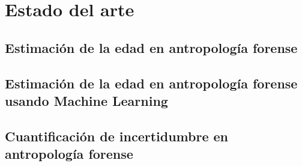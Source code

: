 \chapter{Estado del arte}


\section{Estimación de la edad en antropología forense}





\section{Estimación de la edad en antropología forense usando Machine Learning}





\section{Cuantificación de incertidumbre en antropología forense}







